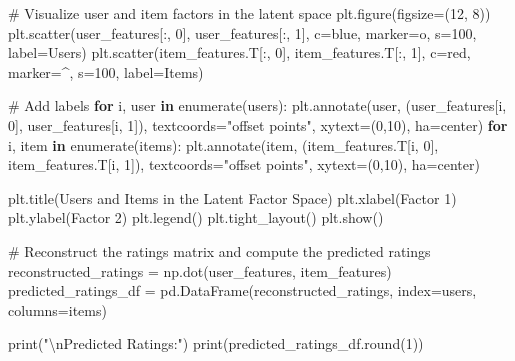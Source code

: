 \documentclass[
  letterpaper,
  DIV=11,
  numbers=noendperiod]{scrreprt}
\newenvironment{Shaded}{\begin{snugshade}}{\end{snugshade}}
\newcommand{\BuiltInTok}[1]{\textcolor[rgb]{0.00,0.23,0.31}{#1}}
\newcommand{\CharTok}[1]{\textcolor[rgb]{0.13,0.47,0.30}{#1}}
\newcommand{\CommentTok}[1]{\textcolor[rgb]{0.37,0.37,0.37}{#1}}
\newcommand{\ControlFlowTok}[1]{\textcolor[rgb]{0.00,0.23,0.31}{\textbf{#1}}}
\newcommand{\DecValTok}[1]{\textcolor[rgb]{0.68,0.00,0.00}{#1}}
\newcommand{\KeywordTok}[1]{\textcolor[rgb]{0.00,0.23,0.31}{\textbf{#1}}}
\newcommand{\NormalTok}[1]{\textcolor[rgb]{0.00,0.23,0.31}{#1}}
\newcommand{\OperatorTok}[1]{\textcolor[rgb]{0.37,0.37,0.37}{#1}}
\newcommand{\StringTok}[1]{\textcolor[rgb]{0.13,0.47,0.30}{#1}}
\begin{document}
\begin{Shaded}
\begin{Highlighting}[]
\CommentTok{\# Visualize user and item factors in the latent space}
\NormalTok{plt.figure(figsize}\OperatorTok{=}\NormalTok{(}\DecValTok{12}\NormalTok{, }\DecValTok{8}\NormalTok{))}
\NormalTok{plt.scatter(user\_features[:, }\DecValTok{0}\NormalTok{], user\_features[:, }\DecValTok{1}\NormalTok{], c}\OperatorTok{=}\StringTok{\textquotesingle{}blue\textquotesingle{}}\NormalTok{, marker}\OperatorTok{=}\StringTok{\textquotesingle{}o\textquotesingle{}}\NormalTok{, s}\OperatorTok{=}\DecValTok{100}\NormalTok{, label}\OperatorTok{=}\StringTok{\textquotesingle{}Users\textquotesingle{}}\NormalTok{)}
\NormalTok{plt.scatter(item\_features.T[:, }\DecValTok{0}\NormalTok{], item\_features.T[:, }\DecValTok{1}\NormalTok{], c}\OperatorTok{=}\StringTok{\textquotesingle{}red\textquotesingle{}}\NormalTok{, marker}\OperatorTok{=}\StringTok{\textquotesingle{}\^{}\textquotesingle{}}\NormalTok{, s}\OperatorTok{=}\DecValTok{100}\NormalTok{, label}\OperatorTok{=}\StringTok{\textquotesingle{}Items\textquotesingle{}}\NormalTok{)}

\CommentTok{\# Add labels}
\ControlFlowTok{for}\NormalTok{ i, user }\KeywordTok{in} \BuiltInTok{enumerate}\NormalTok{(users):}
\NormalTok{    plt.annotate(user, (user\_features[i, }\DecValTok{0}\NormalTok{], user\_features[i, }\DecValTok{1}\NormalTok{]), textcoords}\OperatorTok{=}\StringTok{"offset points"}\NormalTok{, }
\NormalTok{                 xytext}\OperatorTok{=}\NormalTok{(}\DecValTok{0}\NormalTok{,}\DecValTok{10}\NormalTok{), ha}\OperatorTok{=}\StringTok{\textquotesingle{}center\textquotesingle{}}\NormalTok{)}
\ControlFlowTok{for}\NormalTok{ i, item }\KeywordTok{in} \BuiltInTok{enumerate}\NormalTok{(items):}
\NormalTok{    plt.annotate(item, (item\_features.T[i, }\DecValTok{0}\NormalTok{], item\_features.T[i, }\DecValTok{1}\NormalTok{]), textcoords}\OperatorTok{=}\StringTok{"offset points"}\NormalTok{, }
\NormalTok{                 xytext}\OperatorTok{=}\NormalTok{(}\DecValTok{0}\NormalTok{,}\DecValTok{10}\NormalTok{), ha}\OperatorTok{=}\StringTok{\textquotesingle{}center\textquotesingle{}}\NormalTok{)}

\NormalTok{plt.title(}\StringTok{\textquotesingle{}Users and Items in the Latent Factor Space\textquotesingle{}}\NormalTok{)}
\NormalTok{plt.xlabel(}\StringTok{\textquotesingle{}Factor 1\textquotesingle{}}\NormalTok{)}
\NormalTok{plt.ylabel(}\StringTok{\textquotesingle{}Factor 2\textquotesingle{}}\NormalTok{)}
\NormalTok{plt.legend()}
\NormalTok{plt.tight\_layout()}
\NormalTok{plt.show()}

\CommentTok{\# Reconstruct the ratings matrix and compute the predicted ratings}
\NormalTok{reconstructed\_ratings }\OperatorTok{=}\NormalTok{ np.dot(user\_features, item\_features)}
\NormalTok{predicted\_ratings\_df }\OperatorTok{=}\NormalTok{ pd.DataFrame(reconstructed\_ratings, index}\OperatorTok{=}\NormalTok{users, columns}\OperatorTok{=}\NormalTok{items)}

\BuiltInTok{print}\NormalTok{(}\StringTok{"}\CharTok{\textbackslash{}n}\StringTok{Predicted Ratings:"}\NormalTok{)}
\BuiltInTok{print}\NormalTok{(predicted\_ratings\_df.}\BuiltInTok{round}\NormalTok{(}\DecValTok{1}\NormalTok{))}
\end{Highlighting}
\end{Shaded}
\end{document}
